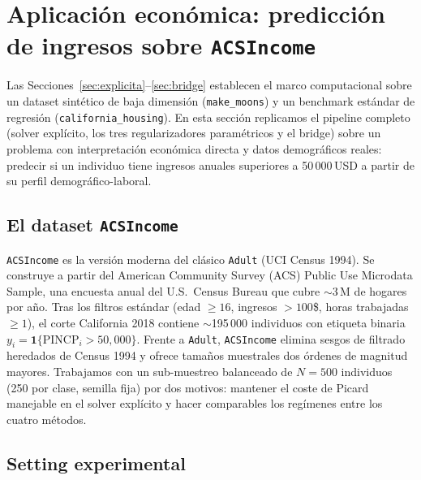 \documentclass[11pt, a4paper]{article}
\theoremstyle{definition}
\begin{document}
\section{Aplicación económica: predicción de ingresos sobre
\texttt{ACSIncome}}
\label{sec:economia}

Las Secciones~\ref{sec:explicita}--\ref{sec:bridge} establecen el
marco computacional sobre un dataset sintético de baja dimensión
(\texttt{make\_moons}) y un benchmark estándar de regresión
(\texttt{california\_housing}). En esta sección replicamos el
pipeline completo (solver explícito, los tres regularizadores
paramétricos y el bridge) sobre un problema con interpretación
económica directa y datos demográficos reales: predecir si un
individuo tiene ingresos anuales superiores a 50\,000\,USD a partir
de su perfil demográfico-laboral.

\subsection{El dataset \texttt{ACSIncome}}
\label{ssec:dataset-acs}

\texttt{ACSIncome} \cite{Ding2021} es la versión moderna del clásico
\texttt{Adult} (UCI Census 1994). Se construye a partir del American
Community Survey (ACS) Public Use Microdata Sample, una encuesta
anual del U.S.~Census Bureau que cubre $\sim$3\,M de hogares por año.
Tras los filtros estándar (edad $\geq 16$, ingresos $> 100$\$,
horas trabajadas $\geq 1$), el corte California 2018 contiene
$\sim$195\,000 individuos con etiqueta binaria
$y_i = \mathbf{1}\{\text{PINCP}_i > 50{,}000\}$. Frente a
\texttt{Adult}, \texttt{ACSIncome} elimina sesgos de filtrado
heredados de Census 1994 y ofrece tamaños muestrales dos órdenes de
magnitud mayores. Trabajamos con un sub-muestreo balanceado de
$N=500$ individuos (250 por clase, semilla fija) por dos motivos:
mantener el coste de Picard manejable en el solver explícito y
hacer comparables los regímenes entre los cuatro métodos.

\subsection{Setting experimental}
\label{ssec:setting-acs}
\end{document}
